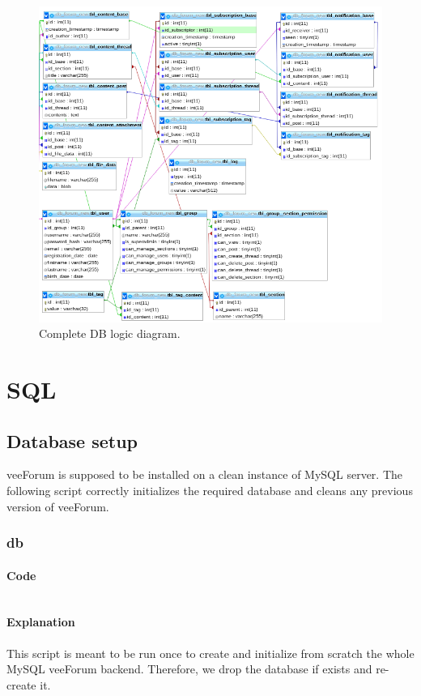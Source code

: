 \documentclass[12pt]{report}
\newcommand{\printSQLtest}[1]
{
    \inputminted[linenos, breaklines, breakbytoken, tabsize=4, fontsize=\footnotesize]{mysql}{#1}
}
\newcommand{\printSQLTablepage}[2]
{    
    \subsection{#2}
    \subsubsection{Code}
    \printSQLtest{../sql/parts/#1}
    \subsubsection{Explanation}
}
\begin{document}
                \begin{figure}[!htb]
                \caption{Complete DB logic diagram.}
                \centering
                \includegraphics[width=1\textwidth]{logics}
                \end{figure}
                
                \newpage

        \chapter{SQL}

            \section{Database setup}

                veeForum is supposed to be installed on a clean instance of MySQL server. The following script correctly initializes the required database and cleans any previous version of veeForum.

                \printSQLTablepage{00_db.sql}{db}
                    This script is meant to be run once to create and initialize from scratch the whole MySQL veeForum backend.
                    Therefore, we drop the database if exists and re-create it.

                \newpage
\end{document}
